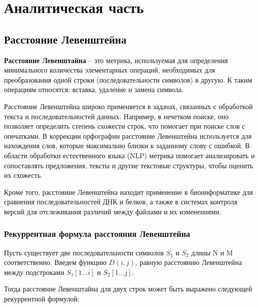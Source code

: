 \chapter{Аналитическая часть}
\section{Расстояние Левенштейна}
\textbf{Расстояние Левенштайна} -- это метрика, используемая для определения минимального количества элементарных операций, необходимых для преобразования одной строки (последовательности символов) в другую. К таким операциям относятся: вставка, удаление и замена символа.

Расстояние Левенштейна широко применяется в задачах, связанных с обработкой текста и последовательностей данных. Например, в нечетком поиске, оно позволяет определить степень схожести строк, что помогает при поиске слов с опечатками. В коррекции орфографии расстояние Левенштейна используется для нахождения слов, которые максимально близки к заданному слову с ошибкой. В области обработки естественного языка (NLP) метрика помогает анализировать и сопоставлять предложения, тексты и другие текстовые структуры, чтобы оценить их схожесть.

Кроме того, расстояние Левенштейна находит применение в биоинформатике для сравнения последовательностей ДНК и белков, а также в системах контроля версий для отслеживания различий между файлами и их изменениями.\cite{lev}

\subsection{Рекуррентная формула расстояния Левенштейна}

Пусть существует две последовательности символов $S_1$ и $S_2$ длины N и M соответственно. Введем функцию $D(i, j)$, равную расстоянию Левенштейна между подстроками $S_1[1...i]$ и $S_2[1...j]$.

Тогда расстояние Левенштайна для двух строк может быть выражено следующей рекуррентной формулой:


